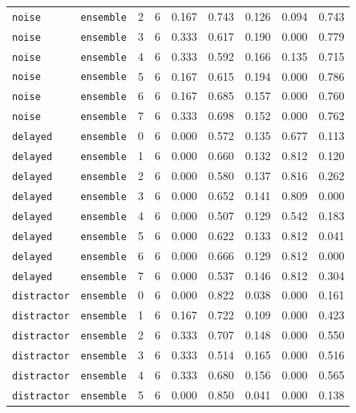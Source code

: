 \documentclass{article}
\begin{document}
\begin{center}
\begin{tabular}{lllcccccc}
\texttt{noise} & \texttt{ensemble} & 2 & 6 & 0.167 & 0.743 & 0.126 & 0.094 & 0.743 \\
\texttt{noise} & \texttt{ensemble} & 3 & 6 & 0.333 & 0.617 & 0.190 & 0.000 & 0.779 \\
\texttt{noise} & \texttt{ensemble} & 4 & 6 & 0.333 & 0.592 & 0.166 & 0.135 & 0.715 \\
\texttt{noise} & \texttt{ensemble} & 5 & 6 & 0.167 & 0.615 & 0.194 & 0.000 & 0.786 \\
\texttt{noise} & \texttt{ensemble} & 6 & 6 & 0.167 & 0.685 & 0.157 & 0.000 & 0.760 \\
\texttt{noise} & \texttt{ensemble} & 7 & 6 & 0.333 & 0.698 & 0.152 & 0.000 & 0.762 \\
\texttt{delayed} & \texttt{ensemble} & 0 & 6 & 0.000 & 0.572 & 0.135 & 0.677 & 0.113 \\
\texttt{delayed} & \texttt{ensemble} & 1 & 6 & 0.000 & 0.660 & 0.132 & 0.812 & 0.120 \\
\texttt{delayed} & \texttt{ensemble} & 2 & 6 & 0.000 & 0.580 & 0.137 & 0.816 & 0.262 \\
\texttt{delayed} & \texttt{ensemble} & 3 & 6 & 0.000 & 0.652 & 0.141 & 0.809 & 0.000 \\
\texttt{delayed} & \texttt{ensemble} & 4 & 6 & 0.000 & 0.507 & 0.129 & 0.542 & 0.183 \\
\texttt{delayed} & \texttt{ensemble} & 5 & 6 & 0.000 & 0.622 & 0.133 & 0.812 & 0.041 \\
\texttt{delayed} & \texttt{ensemble} & 6 & 6 & 0.000 & 0.666 & 0.129 & 0.812 & 0.000 \\
\texttt{delayed} & \texttt{ensemble} & 7 & 6 & 0.000 & 0.537 & 0.146 & 0.812 & 0.304 \\
\texttt{distractor} & \texttt{ensemble} & 0 & 6 & 0.000 & 0.822 & 0.038 & 0.000 & 0.161 \\
\texttt{distractor} & \texttt{ensemble} & 1 & 6 & 0.167 & 0.722 & 0.109 & 0.000 & 0.423 \\
\texttt{distractor} & \texttt{ensemble} & 2 & 6 & 0.333 & 0.707 & 0.148 & 0.000 & 0.550 \\
\texttt{distractor} & \texttt{ensemble} & 3 & 6 & 0.333 & 0.514 & 0.165 & 0.000 & 0.516 \\
\texttt{distractor} & \texttt{ensemble} & 4 & 6 & 0.333 & 0.680 & 0.156 & 0.000 & 0.565 \\
\texttt{distractor} & \texttt{ensemble} & 5 & 6 & 0.000 & 0.850 & 0.041 & 0.000 & 0.138 \\
\bottomrule
\end{tabular}
\end{center}
\end{document}
